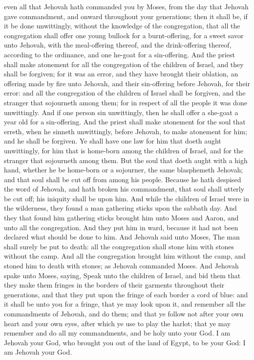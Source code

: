 even all that Jehovah hath commanded you by Moses, from the day that Jehovah gave commandment, and onward throughout your generations; then it shall be, if it be done unwittingly, without the knowledge of the congregation, that all the congregation shall offer one young bullock for a burnt-offering, for a sweet savor unto Jehovah, with the meal-offering thereof, and the drink-offering thereof, according to the ordinance, and one he-goat for a sin-offering. And the priest shall make atonement for all the congregation of the children of Israel, and they shall be forgiven; for it was an error, and they have brought their oblation, an offering made by fire unto Jehovah, and their sin-offering before Jehovah, for their error: and all the congregation of the children of Israel shall be forgiven, and the stranger that sojourneth among them; for in respect of all the people it was done unwittingly.  And if one person sin unwittingly, then he shall offer a she-goat a year old for a sin-offering. And the priest shall make atonement for the soul that erreth, when he sinneth unwittingly, before Jehovah, to make atonement for him; and he shall be forgiven. Ye shall have one law for him that doeth aught unwittingly, for him that is home-born among the children of Israel, and for the stranger that sojourneth among them. But the soul that doeth aught with a high hand, whether he be home-born or a sojourner, the same blasphemeth Jehovah; and that soul shall be cut off from among his people. Because he hath despised the word of Jehovah, and hath broken his commandment, that soul shall utterly be cut off; his iniquity shall be upon him.  And while the children of Israel were in the wilderness, they found a man gathering sticks upon the sabbath day. And they that found him gathering sticks brought him unto Moses and Aaron, and unto all the congregation. And they put him in ward, because it had not been declared what should be done to him. And Jehovah said unto Moses, The man shall surely be put to death: all the congregation shall stone him with stones without the camp. And all the congregation brought him without the camp, and stoned him to death with stones; as Jehovah commanded Moses.  And Jehovah spake unto Moses, saying, Speak unto the children of Israel, and bid them that they make them fringes in the borders of their garments throughout their generations, and that they put upon the fringe of each border a cord of blue: and it shall be unto you for a fringe, that ye may look upon it, and remember all the commandments of Jehovah, and do them; and that ye follow not after your own heart and your own eyes, after which ye use to play the harlot; that ye may remember and do all my commandments, and be holy unto your God. I am Jehovah your God, who brought you out of the land of Egypt, to be your God: I am Jehovah your God. 

